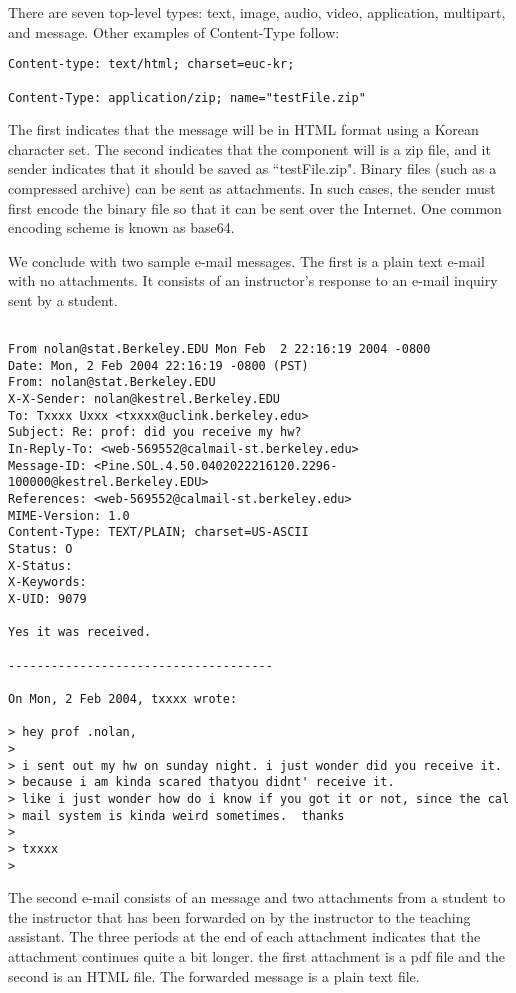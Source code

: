 There are seven top-level types: text, image, audio, video, application,
multipart, and message.  Other examples of Content-Type follow:

\begin{verbatim}
Content-type: text/html; charset=euc-kr;

Content-Type: application/zip; name="testFile.zip"
\end{verbatim}

The first indicates that the message will be in HTML format using a
Korean character set.  The second indicates that the component will
is a zip file, and it sender indicates that it should be saved as
``testFile.zip".
Binary files (such as a compressed archive) can be
sent as attachments. 
In such cases, the sender must first encode the binary
file so that it can be sent over the Internet. 
One common encoding scheme is known as base64. 

We conclude with two sample e-mail messages.
The first is a plain text e-mail with no
attachments.  It consists of an instructor's response
to an e-mail inquiry sent by a student. 

\begin{verbatim}
 
From nolan@stat.Berkeley.EDU Mon Feb  2 22:16:19 2004 -0800
Date: Mon, 2 Feb 2004 22:16:19 -0800 (PST)
From: nolan@stat.Berkeley.EDU
X-X-Sender: nolan@kestrel.Berkeley.EDU
To: Txxxx Uxxx <txxxx@uclink.berkeley.edu>
Subject: Re: prof: did you receive my hw?
In-Reply-To: <web-569552@calmail-st.berkeley.edu>
Message-ID: <Pine.SOL.4.50.0402022216120.2296-100000@kestrel.Berkeley.EDU>
References: <web-569552@calmail-st.berkeley.edu>
MIME-Version: 1.0
Content-Type: TEXT/PLAIN; charset=US-ASCII
Status: O
X-Status:
X-Keywords:
X-UID: 9079
  
Yes it was received.
 
-------------------------------------
 
On Mon, 2 Feb 2004, txxxx wrote:
 
> hey prof .nolan,
>
> i sent out my hw on sunday night. i just wonder did you receive it.
> because i am kinda scared thatyou didnt' receive it.
> like i just wonder how do i know if you got it or not, since the cal
> mail system is kinda weird sometimes.  thanks
>
> txxxx
>
\end{verbatim}    

The second e-mail consists of an message and two attachments from
a student to the instructor that has been forwarded on by the 
instructor to the teaching assistant.
The three periods at the end of each attachment indicates
that the attachment continues quite a bit longer.
the first attachment is a pdf file and the second is an HTML file.
The forwarded message is a plain text file.

